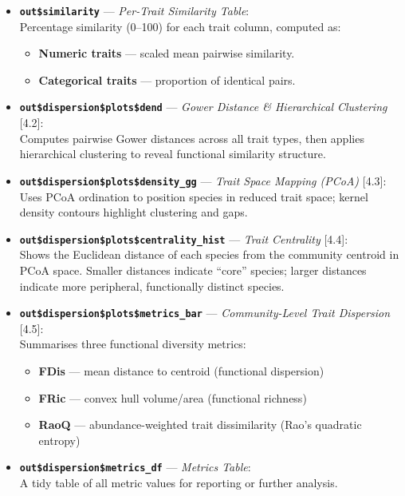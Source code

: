 \documentclass[
]{article}
\providecommand{\tightlist}{%
  \setlength{\itemsep}{0pt}\setlength{\parskip}{0pt}}
\begin{document}
\begin{itemize}
\item
  \textbf{\texttt{out\$similarity}} --- \emph{Per-Trait Similarity
  Table}:\\
  Percentage similarity (0--100) for each trait column, computed as:

  \begin{itemize}
  \tightlist
  \item
    \textbf{Numeric traits} --- scaled mean pairwise similarity.
  \item
    \textbf{Categorical traits} --- proportion of identical pairs.
  \end{itemize}
\item
  \textbf{\texttt{out\$dispersion\$plots\$dend}} --- \emph{Gower
  Distance \& Hierarchical Clustering} {[}4.2{]}:\\
  Computes pairwise Gower distances across all trait types, then applies
  hierarchical clustering to reveal functional similarity structure.
\item
  \textbf{\texttt{out\$dispersion\$plots\$density\_gg}} --- \emph{Trait
  Space Mapping (PCoA)} {[}4.3{]}:\\
  Uses PCoA ordination to position species in reduced trait space;
  kernel density contours highlight clustering and gaps.
\item
  \textbf{\texttt{out\$dispersion\$plots\$centrality\_hist}} ---
  \emph{Trait Centrality} {[}4.4{]}:\\
  Shows the Euclidean distance of each species from the community
  centroid in PCoA space. Smaller distances indicate ``core'' species;
  larger distances indicate more peripheral, functionally distinct
  species.
\item
  \textbf{\texttt{out\$dispersion\$plots\$metrics\_bar}} ---
  \emph{Community-Level Trait Dispersion} {[}4.5{]}:\\
  Summarises three functional diversity metrics:

  \begin{itemize}
  \tightlist
  \item
    \textbf{FDis} --- mean distance to centroid (functional dispersion)
  \item
    \textbf{FRic} --- convex hull volume/area (functional richness)
  \item
    \textbf{RaoQ} --- abundance-weighted trait dissimilarity (Rao's
    quadratic entropy)
  \end{itemize}
\item
  \textbf{\texttt{out\$dispersion\$metrics\_df}} --- \emph{Metrics
  Table}:\\
  A tidy table of all metric values for reporting or further analysis.
\end{itemize}
\end{document}
